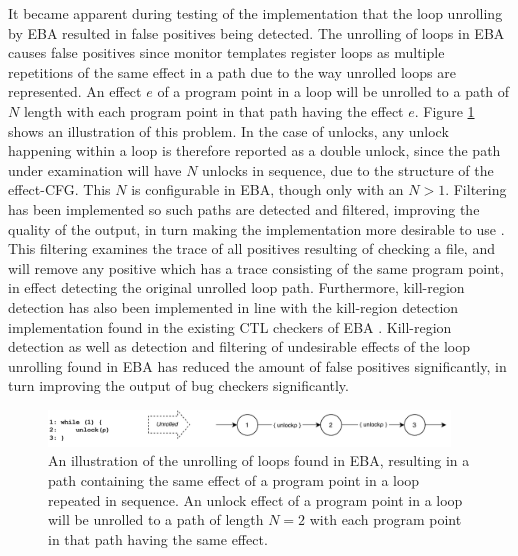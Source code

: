 \newpar It became apparent during testing of the implementation that the loop unrolling by EBA resulted in false positives being detected. The unrolling of loops in EBA causes false positives since monitor templates register loops as multiple repetitions of the same effect in a path due to the way unrolled loops are represented. An effect $e$ of a program point in a loop will be unrolled to a path of $N$ length with each program point in that path having the effect $e$. Figure \ref{unrolling-false-positive} shows an illustration of this problem. In the case of unlocks, any unlock happening within a loop is therefore reported as a double unlock, since the path under examination will have $N$ unlocks in sequence, due to the structure of the effect-CFG. This $N$ is configurable in EBA, though only with an $N > 1$. Filtering has been implemented so such paths are detected and filtered, improving the quality of the output, in turn making the implementation more desirable to use \cite{false-positives}. This filtering examines the trace of all positives resulting of checking a file, and will remove any positive which has a trace consisting of the same program point, in effect detecting the original unrolled loop path. Furthermore, kill-region detection has also been implemented in line with the kill-region detection implementation found in the existing CTL checkers of EBA \cite{Abal2017EffectiveBF}. Kill-region detection as well as detection and filtering of undesirable effects of the loop unrolling found in EBA has reduced the amount of false positives significantly, in turn improving the output of bug checkers significantly. 

\begin{figure}[H]
    \centering
    \includegraphics[width=0.95\textwidth]{implementation/figures/unrolling-false-positive}
    \caption{An illustration of the unrolling of loops found in EBA, resulting in a path containing the same effect of a program point in a loop repeated in sequence. An unlock effect of a program point in a loop will be unrolled to a path of length $N = 2$ with each program point in that path having the same effect.}
    \label{unrolling-false-positive}
\end{figure}